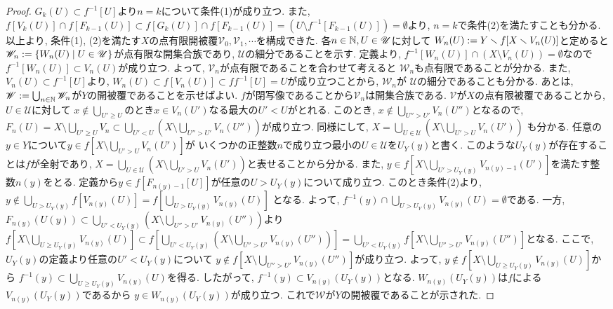 \documentclass[uplatex, dvipdfmx, a4paper, 12pt, class=jsbook, crop=false]{standalone}
\begin{document}
\begin{proof}
	$ G_k(U) \subset f^{-1}[U] $より$ n = k $について条件(1)が成り立つ.
	また, $ f[V_k(U)] \cap f[F_{k-1}(U)] \subset f[G_k(U)] \cap f[F_{k-1}(U)] 
	= \left(U \setminus f^{-1}[F_{k-1}(U)] \right) = \emptyset $より, 
	$ n = k $で条件(2)を満たすことも分かる.
	以上より, 条件(1), (2)を満たす$ X $の点有限開被覆$ \mathscr{V}_0, \mathscr{V}_1, \cdots $を構成できた.
	各$ n \in \mathbb{N}, U \in \mathscr{U} $に対して
	$ W_n(U) \mathrel{:=} Y \smallsetminus f[X \smallsetminus V_n(U)] $と定めると
	$ \mathscr{W}_n \defeq \setcomp{W_n(U)}{U \in \mathscr{U}} $が点有限な開集合族であり,
	$ \mathscr{U} $の細分であることを示す.
	定義より, $ f^{-1}[W_n(U)] \cap (X \setminus V_n(U)) = \emptyset $なので
	$ f^{-1}[W_n(U)] \subset V_n(U) $が成り立つ. よって, $ \mathscr{V}_n $が点有限であることを合わせて考えると
	$ \mathscr{W}_n $も点有限であることが分かる. また, $ V_n(U) \subset f^{-1}[U] $より,
	$ W_n(U) \subset f[V_n(U)] \subset ff^{-1}[U] = U $が成り立つことから, $ \mathscr{W}_n $が
	$ \mathscr{U} $の細分であることも分かる.
	あとは, $ \mathscr{W} \mathrel{:=} \bigcup_{n \in \mathbb{N}} \mathscr{W}_n $が$ Y $の開被覆であることを示せばよい.
	$ f $が閉写像であることから$ \mathscr{V}_n $は開集合族である.
	$ \mathscr{V} $が$ X $の点有限被覆であることから, $ U \in \mathscr{U} $に対して
	$ x \notin \bigcup_{U'\geq U} $のとき$ x \in V_n(U') $なる最大の$ U' < U $がとれる.
	このとき, $ x \notin \bigcup_{U'' > U'} V_n(U'') $となるので,
	$ F_n(U) = X \setminus \bigcup_{U' \geq U} V_{n} 
	\subset \bigcup_{U' < U} \left(X \setminus \bigcup_{U'' > U'} V_n(U'') \right) $が成り立つ.
	同様にして, $ X = \bigcup_{U \in \mathscr{U}}\left(X \setminus \bigcup_{U' > U}V_n(U')\right) $
	も分かる. 任意の$ y \in Y $について$ y \in f[X \setminus \bigcup_{U' > U}V_n(U')] $が
	いくつかの正整数$ n $で成り立つ最小の$ U \in \mathscr{U} $を$ U_Y(y) $と書く. 
	このような$ U_Y(y) $が存在することは$ f $が全射であり, 
	$ X = \bigcup_{U \in \mathscr{U}}\left(X \setminus \bigcup_{U' > U}V_n(U')\right) $と表せることから分かる.
	また, $ y \in f[X \setminus \bigcup_{U' > U_Y(y)} V_{n(y)-1}(U')] $を満たす整数$ n(y) $をとる.
	定義から$ y \in f[F_{n(y)-1}[U]] $が任意の$ U > U_Y(y) $について成り立つ.
	このとき条件(2)より, $ y \notin \bigcup_{U > U_Y(y)} f[V_{n(y)}(U)] = f[\bigcup_{U > U_Y(y)} V_{n(y)}(U)] $
	となる. よって, $ f^{-1}(y) \cap \bigcup_{U > U_Y(y)} V_{n(y)}(U) = \emptyset $である.
	一方, $ F_{n(y)}(U(y)) \subset \bigcup_{U' < U_Y(y)} \left(X \setminus \bigcup_{U'' > U'} V_{n(y)}(U'') \right) $より
	$ f[X \setminus \bigcup_{U \geq U_Y(y)} V_{n(y)}(U)] 
	\subset f[\bigcup_{U' < U_Y(y)} \left(X \setminus \bigcup_{U'' > U'} V_{n(y)}(U'') \right)] 
	= \bigcup_{U' < U_Y(y)} f[X \setminus \bigcup_{U'' > U'} V_{n(y)}(U'')] $となる. 
	ここで, $ U_Y(y) $の定義より任意の$ U' < U_Y(y) $について
	$ y \notin f[X \setminus \bigcup_{U'' > U'} V_{n(y)}(U'')] $が成り立つ.
	よって, $ y \notin f[X \setminus \bigcup_{U \geq U_Y(y)} V_{n(y)}(U)] $から
	$ f^{-1}(y) \subset \bigcup_{U \geq U_Y(y)} V_{n(y)}(U) $を得る.
	したがって, $ f^{-1}(y) \subset V_{n(y)}(U_Y(y)) $となる.
	$ W_{n(y)}(U_Y(y)) $は$ f $による$ V_{n(y)}(U_Y(y)) $であるから
	$ y \in W_{n(y)}(U_Y(y)) $が成り立つ. これで$ \mathscr{W} $が$ Y $の開被覆であることが示された.
\end{proof}
\end{document}
